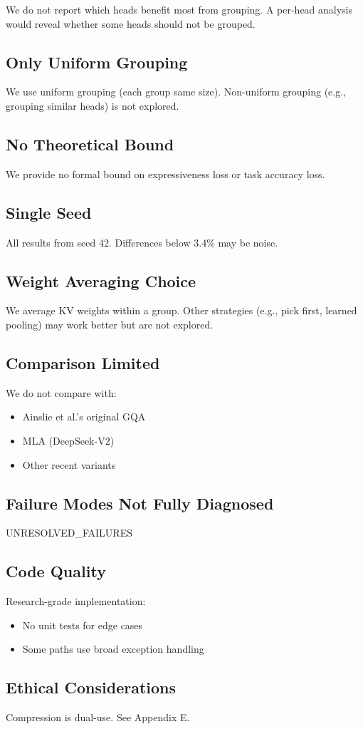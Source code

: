 We do not report which heads benefit most from grouping. A per-head analysis 
would reveal whether some heads should not be grouped.

\subsection{Only Uniform Grouping}

We use uniform grouping (each group same size). Non-uniform grouping 
(e.g., grouping similar heads) is not explored.

\subsection{No Theoretical Bound}

We provide no formal bound on expressiveness loss or task accuracy loss.

\subsection{Single Seed}

All results from seed 42. Differences below 3.4\% may be noise.

\subsection{Weight Averaging Choice}

We average KV weights within a group. Other strategies (e.g., pick first, 
learned pooling) may work better but are not explored.

\subsection{Comparison Limited}

We do not compare with:
\begin{itemize}
\item Ainslie et al.'s original GQA
\item MLA (DeepSeek-V2)
\item Other recent variants

\end{itemize}
\subsection{Failure Modes Not Fully Diagnosed}

{{UNRESOLVED\_FAILURES}}

\subsection{Code Quality}

Research-grade implementation:
\begin{itemize}
\item No unit tests for edge cases
\item Some paths use broad exception handling

\end{itemize}
\subsection{Ethical Considerations}

Compression is dual-use. See Appendix E.